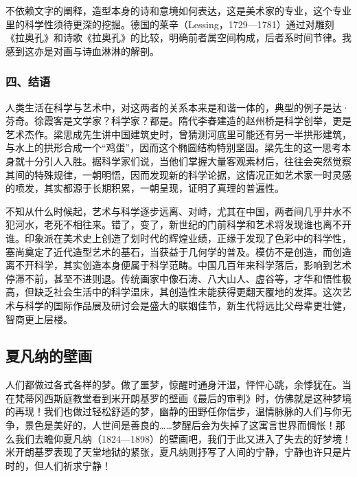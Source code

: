 \documentclass{article}
\begin{document}
不依赖文字的阐释，造型本身的诗和意境如何表达，这是美术家的专业，这个专业里的科学性须待更深的挖掘。德国的莱辛（Lessing，1729—1781）通过对雕刻《拉奥孔》和诗歌《拉奥孔》的比较，明确前者属空间构成，后者系时间节律。我感到这亦是对画与诗血淋淋的解剖。
\subsubsection{四、结语}
人类生活在科学与艺术中，对这两者的关系本来是和谐一体的，典型的例子是达·芬奇。徐霞客是文学家？科学家？都是。隋代李春建造的赵州桥是科学创举，更是艺术杰作。梁思成先生讲中国建筑史时，曾猜测河底里可能还有另一半拱形建筑，与水上的拱形合成一个“鸡蛋”，因而这个椭圆结构特别坚固。梁先生的这一思考本身就十分引人入胜。据科学家们说，当他们掌握大量客观素材后，往往会突然觉察其间的特殊规律，一朝明悟，因而发现新的科学论据，这情况正如艺术家一时灵感的喷发，其实都源于长期积累，一朝呈现，证明了真理的普遍性。

不知从什么时候起，艺术与科学逐步远离、对峙，尤其在中国，两者间几乎井水不犯河水，老死不相往来。错了，变了，新世纪的门前科学和艺术将发现谁也离不开谁。印象派在美术史上创造了划时代的辉煌业绩，正缘于发现了色彩中的科学性，塞尚奠定了近代造型艺术的基石，当获益于几何学的普及。模仿不是创造，而创造离不开科学，其实创造本身便属于科学范畴。中国几百年来科学落后，影响到艺术停滞不前，甚至不进则退。传统画家中像石涛、八大山人、虚谷等，才华和悟性极高，但缺乏社会生活中的科学温床，其创造性未能获得更翻天覆地的发挥。这次艺术与科学的国际作品展及研讨会是盛大的联姻佳节，新生代将远比父母辈更壮健，智商更上层楼。
\subsection{夏凡纳的壁画}
人们都做过各式各样的梦。做了噩梦，惊醒时通身汗湿，怦怦心跳，余悸犹在。当在梵蒂冈西斯庭教堂看到米开朗基罗的壁画《最后的审判》时，仿佛就是这种梦境的再现！我们也做过轻松舒适的梦，幽静的田野任你信步，温情脉脉的人们与你无争，景色是美好的，人世间是善良的……梦醒后会为失掉了这寓言世界而惆怅！那么我们去瞻仰夏凡纳（1824—1898）的壁画吧，我们于此又进入了失去的好梦境！米开朗基罗表现了天堂地狱的紧张，夏凡纳则抒写了人间的宁静，宁静也许只是片时的，但人们祈求宁静！
\end{document}
